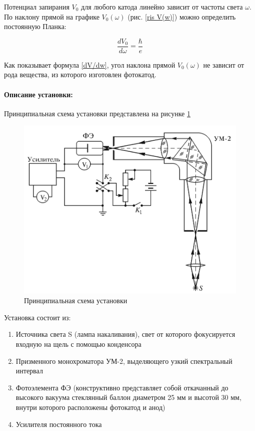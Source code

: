 \documentclass[a4paper,12pt]{article}
\begin{document}
	Потенциал запирания $ V_0 $ для любого катода линейно зависит от
	частоты света $ \omega $. По наклону прямой на графике $ V_0(\omega) $ (рис. \ref{ris V(w)}) можно определить постоянную Планка:
	
	\begin{equation}\label{e:plank}
	\dfrac{dV_0}{d\omega} = \dfrac{\hbar}{e}
	\end{equation}
	
	Как показывает формула \eqref{dV/dw}, угол наклона прямой $ V_0(\omega) $ не зависит от рода вещества, из которого изготовлен фотокатод. 
\paragraph{Описание установки:}
Принципиальная схема установки представлена на рисунке {\ref{setup}}
\begin{figure}[h!]
\centering
\includegraphics[scale=0.4]{setup.png}
\caption{Принципиальная схема установки}
\label{setup} 
\end{figure}
Установка состоит из:
\begin{enumerate}
\itemsep0em
\item Источника света S (лампа накаливания), свет от которого фокусируется входную на щель с помощью конденсора 
\item Призменного монохроматора УМ-2, выделяющего узкий спектральный интервал
\item Фотоэлемента ФЭ (конструктивно представляет собой откачанный до высокого вакуума стеклянный баллон диаметром 25 мм и высотой 30 мм, внутри которого расположены фотокатод и анод)
\item Усилителя постоянного тока  
\end{enumerate}
\end{document}
